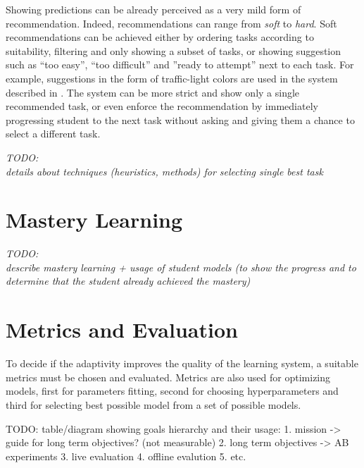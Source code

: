 Showing predictions can be already perceived as a very mild form of recommendation.
Indeed, recommendations can range from \emph{soft} to \emph{hard}.
Soft recommendations can be achieved either by
  ordering tasks according to suitability,
  filtering and only showing a subset of tasks,
  or showing suggestion such as
  ``too easy'', ``too difficult'' and ''ready to attempt'' next to each task.
For example, suggestions in the form of traffic-light colors
  are used in the system described in \cite{its-programming}.
The system can be more strict and show only a single recommended task,
  or even enforce the recommendation by immediately progressing student to
  the next task without asking and giving them a chance to select a different task.

\bigskip
\emph{TODO:\\details about techniques (heuristics, methods) for selecting single best task}


\section{Mastery Learning}
\label{sec:mastery-learning}

\emph{TODO:\\describe mastery learning + usage of student models%
(to show the progress and to determine that the student already achieved the mastery)}



\section{Metrics and Evaluation}
\label{sec:metrics-and-evaluation}


To decide if the adaptivity improves the quality of the learning system,
  a suitable metrics must be chosen and evaluated.
Metrics are also used for optimizing models,
  first for parameters fitting, second for choosing hyperparameters
  and third for selecting best possible model from a set of possible models.

TODO: table/diagram showing goals hierarchy and their usage:
1. mission -> guide for long term objectives? (not measurable)
2. long term objectives -> AB experiments
3. live evaluation
4. offline evalution
5. etc.

